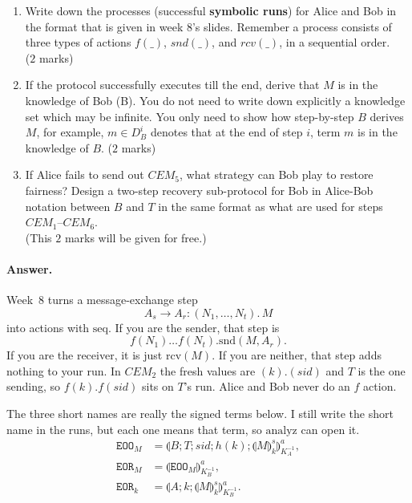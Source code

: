 \documentclass{article}
\newcommand{\setenc}[1]{\llparenthesis #1 \rrparenthesis}
\newcommand{\sym}[1]{\texttt{#1}}
\begin{document}
\begin{enumerate}
    \item Write down the processes (successful \textbf{symbolic runs}) for Alice and Bob in the format that is given in week $8$'s slides. Remember a process consists of three types of actions $f(\_)$, $snd(\_)$, and $rcv(\_)$, in a sequential order. \\($2$ marks)
    \item If the protocol successfully executes till the end, derive that $M$ is in the knowledge of Bob (B). You do not need to write down explicitly a knowledge set which may be infinite. You only need to show how step-by-step $B$ derives $M$, for example, $m\in D^i_B$ denotes that at the end of step $i$, term $m$ is in the knowledge of $B$. ($2$ marks)
    \item If Alice fails to send out $CEM_{5}$, what strategy can Bob play to restore fairness? Design a two-step recovery sub-protocol for Bob in Alice-Bob notation between $B$ and $T$ in the same format as what are used for steps $CEM_{1}$--$CEM_{6}$.\\ (This $2$ marks will be given for free.)
\end{enumerate}

\paragraph{Answer.}
Week~8 turns a message-exchange step
\[
    A_s \rightarrow A_r : (N_1,\ldots,N_t).\, M
\]
into actions with $\mathrm{seq}$. If you are the sender, that step is
\[
    f(N_1)\ldots f(N_t).\mathrm{snd}(M, A_r).
\]
If you are the receiver, it is just $\mathrm{rcv}(M)$. If you are neither, that step adds nothing to your run. In $CEM_2$ the fresh values are $(k).(sid)$ and $T$ is the one sending, so $f(k).f(sid)$ sits on $T$'s run. Alice and Bob never do an $f$ action.

The three short names are really the signed terms below. I still write the short name in the runs, but each one means that term, so $\mathrm{analyz}$ can open it.
\begin{align*}
    \sym{EOO}_M &= \setenc{B;T;sid;h(k);\setenc{M}^s_{k}}^a_{K_A^{-1}},\\
    \sym{EOR}_M &= \setenc{\sym{EOO}_M}^a_{K_B^{-1}},\\
    \sym{EOR}_k &= \setenc{A;k;\setenc{M}^s_{k}}^a_{K_B^{-1}}.
\end{align*}
\end{document}

